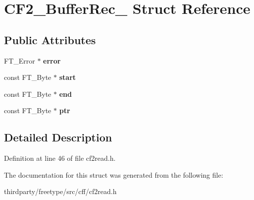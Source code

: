 \hypertarget{struct_c_f2___buffer_rec__}{}\section{C\+F2\+\_\+\+Buffer\+Rec\+\_\+ Struct Reference}
\label{struct_c_f2___buffer_rec__}
\subsection*{Public Attributes}
\begin{DoxyCompactItemize}
\item 
\mbox{\label{struct_c_f2___buffer_rec___adde69d425262f574b3b2699fd6d7ba26}} 
F\+T\+\_\+\+Error $\ast$ {\bfseries error}
\item 
\mbox{\label{struct_c_f2___buffer_rec___a6c38754950bb514b596574dc4a089ede}} 
const F\+T\+\_\+\+Byte $\ast$ {\bfseries start}
\item 
\mbox{\label{struct_c_f2___buffer_rec___a927ccbd21c3e95b5858ea599bc9b2f47}} 
const F\+T\+\_\+\+Byte $\ast$ {\bfseries end}
\item 
\mbox{\label{struct_c_f2___buffer_rec___a0928b29d34f647699864d1c82e06e86b}} 
const F\+T\+\_\+\+Byte $\ast$ {\bfseries ptr}
\end{DoxyCompactItemize}


\subsection{Detailed Description}


Definition at line 46 of file cf2read.\+h.



The documentation for this struct was generated from the following file\+:\begin{DoxyCompactItemize}
\item 
thirdparty/freetype/src/cff/cf2read.\+h\end{DoxyCompactItemize}
